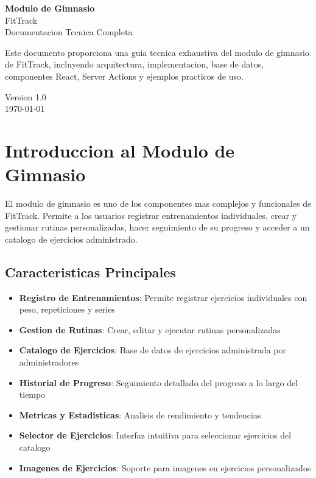 \documentclass[12pt,a4paper]{article}
\begin{document}
\begin{titlepage}
\centering
\vspace*{2cm}

{\Huge\bfseries Modulo de Gimnasio}\\[0.5cm]
{\LARGE FitTrack}\\[1cm]

{\large Documentacion Tecnica Completa}\\[2cm]

\begin{minipage}{0.8\textwidth}
\centering
Este documento proporciona una guia tecnica exhaustiva del modulo de gimnasio de FitTrack, incluyendo arquitectura, implementacion, base de datos, componentes React, Server Actions y ejemplos practicos de uso.
\end{minipage}

\vfill

{\large Version 1.0}\\[0.5cm]
{\large \today}

\end{titlepage}

\tableofcontents
\newpage

\section{Introduccion al Modulo de Gimnasio}

El modulo de gimnasio es uno de los componentes mas complejos y funcionales de FitTrack. Permite a los usuarios registrar entrenamientos individuales, crear y gestionar rutinas personalizadas, hacer seguimiento de su progreso y acceder a un catalogo de ejercicios administrado.

\subsection{Caracteristicas Principales}

\begin{itemize}
    \item \textbf{Registro de Entrenamientos}: Permite registrar ejercicios individuales con peso, repeticiones y series
    \item \textbf{Gestion de Rutinas}: Crear, editar y ejecutar rutinas personalizadas
    \item \textbf{Catalogo de Ejercicios}: Base de datos de ejercicios administrada por administradores
    \item \textbf{Historial de Progreso}: Seguimiento detallado del progreso a lo largo del tiempo
    \item \textbf{Metricas y Estadisticas}: Analisis de rendimiento y tendencias
    \item \textbf{Selector de Ejercicios}: Interfaz intuitiva para seleccionar ejercicios del catalogo
    \item \textbf{Imagenes de Ejercicios}: Soporte para imagenes en ejercicios personalizados
\end{itemize}
\end{document}
